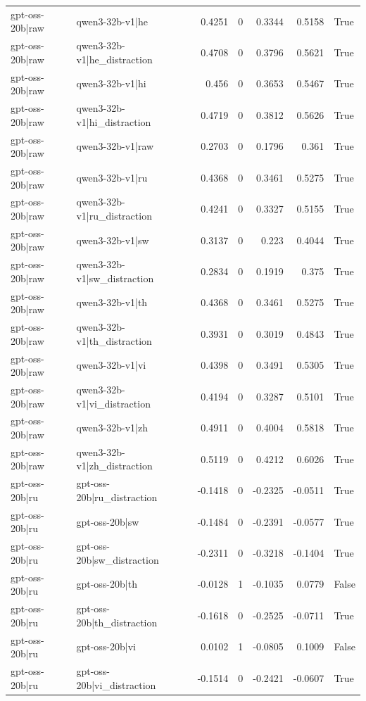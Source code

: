 \begin{table}
\begin{tabular}{l l r r r r l}
gpt-oss-20b|raw & qwen3-32b-v1|he & 0.4251 & 0 & 0.3344 & 0.5158 & True \\
gpt-oss-20b|raw & qwen3-32b-v1|he_distraction & 0.4708 & 0 & 0.3796 & 0.5621 & True \\
gpt-oss-20b|raw & qwen3-32b-v1|hi & 0.456 & 0 & 0.3653 & 0.5467 & True \\
gpt-oss-20b|raw & qwen3-32b-v1|hi_distraction & 0.4719 & 0 & 0.3812 & 0.5626 & True \\
gpt-oss-20b|raw & qwen3-32b-v1|raw & 0.2703 & 0 & 0.1796 & 0.361 & True \\
gpt-oss-20b|raw & qwen3-32b-v1|ru & 0.4368 & 0 & 0.3461 & 0.5275 & True \\
gpt-oss-20b|raw & qwen3-32b-v1|ru_distraction & 0.4241 & 0 & 0.3327 & 0.5155 & True \\
gpt-oss-20b|raw & qwen3-32b-v1|sw & 0.3137 & 0 & 0.223 & 0.4044 & True \\
gpt-oss-20b|raw & qwen3-32b-v1|sw_distraction & 0.2834 & 0 & 0.1919 & 0.375 & True \\
gpt-oss-20b|raw & qwen3-32b-v1|th & 0.4368 & 0 & 0.3461 & 0.5275 & True \\
gpt-oss-20b|raw & qwen3-32b-v1|th_distraction & 0.3931 & 0 & 0.3019 & 0.4843 & True \\
gpt-oss-20b|raw & qwen3-32b-v1|vi & 0.4398 & 0 & 0.3491 & 0.5305 & True \\
gpt-oss-20b|raw & qwen3-32b-v1|vi_distraction & 0.4194 & 0 & 0.3287 & 0.5101 & True \\
gpt-oss-20b|raw & qwen3-32b-v1|zh & 0.4911 & 0 & 0.4004 & 0.5818 & True \\
gpt-oss-20b|raw & qwen3-32b-v1|zh_distraction & 0.5119 & 0 & 0.4212 & 0.6026 & True \\
gpt-oss-20b|ru & gpt-oss-20b|ru_distraction & -0.1418 & 0 & -0.2325 & -0.0511 & True \\
gpt-oss-20b|ru & gpt-oss-20b|sw & -0.1484 & 0 & -0.2391 & -0.0577 & True \\
gpt-oss-20b|ru & gpt-oss-20b|sw_distraction & -0.2311 & 0 & -0.3218 & -0.1404 & True \\
gpt-oss-20b|ru & gpt-oss-20b|th & -0.0128 & 1 & -0.1035 & 0.0779 & False \\
gpt-oss-20b|ru & gpt-oss-20b|th_distraction & -0.1618 & 0 & -0.2525 & -0.0711 & True \\
gpt-oss-20b|ru & gpt-oss-20b|vi & 0.0102 & 1 & -0.0805 & 0.1009 & False \\
gpt-oss-20b|ru & gpt-oss-20b|vi_distraction & -0.1514 & 0 & -0.2421 & -0.0607 & True \\

\end{tabular}
\end{table}
